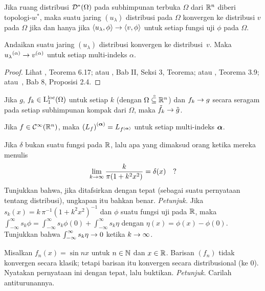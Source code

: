 \begin{prop} Jika ruang distribusi $\mathcal{D}^*(\Omega)$ pada subhimpunan terbuka $\Omega$ dari $\mathbb{R}^n$ diberi topologi-$w^*$,
maka suatu jaring $(u_\lambda)$ distribusi pada $\Omega$ konvergen ke distribusi $v$ pada $\Omega$ jika dan hanya jika
$\left\langle u_\lambda, \phi\right\rangle \rightarrow \left\langle v, \phi\right\rangle$ untuk setiap fungsi uji $\phi$ pada $\Omega$.
\end{prop}

\begin{prop} Andaikan suatu jaring $(u_\lambda)$ distribusi konvergen ke distribusi~$v$. Maka ${u_\lambda}^{(\alpha)} \rightarrow v^{(\alpha)}$
untuk setiap multi-indeks $\alpha$.
\end{prop}

\begin{proof} Lihat \cite{Rudin:1991}, Teorema 6.17; atau \cite{Yosida:1965}, Bab II, Seksi 3, Teorema; atau \cite{Grubb:2009}, Teorema 3.9;
atau~\cite{HirschL:1999}, Bab 8, Proposisi 2.4.
\end{proof}

\begin{prop} Jika $g$, $f_k \in \mathrm{L_1^{loc}}({\Omega})$ untuk setiap $k$ (dengan $\Omega\overset{\thickspace{}_\circ}{\subseteq}\mathbb{R}^n$) dan $f_k \rightarrow g$ secara seragam pada
setiap subhimpunan kompak dari $\Omega$, maka $\tilde f_k \rightarrow \tilde g$.
\end{prop}

\begin{prop} Jika $f \in \mathcal{C}^\infty(\mathbb{R}^n)$, maka $\left(L_f\right)^{(\boldsymbol{\alpha})} = L_{f^{(\boldsymbol{\alpha})}}$ untuk setiap multi-indeks $\boldsymbol{\alpha}$.
\end{prop}

\begin{exer} Jika $\delta$ bukan suatu fungsi pada $\mathbb{R}$, lalu apa yang dimaksud orang ketika mereka menulis
   \[ \lim_{k \rightarrow \infty} \frac{k}{\pi(1+k^2x^2)} = \delta(x)\quad? \]
Tunjukkan bahwa, jika ditafsirkan dengan tepat (sebagai suatu pernyataan tentang distribusi), ungkapan itu bahkan benar. \emph{Petunjuk.}
Jika $s_k(x) = k\,\pi^{-1}(1+k^2x^2)^{-1}$ dan $\phi$ suatu fungsi uji pada $\mathbb{R}$, maka
$\int_{-\infty}^\infty s_k\phi = \int_{-\infty}^\infty s_k\phi(0) + \int_{-\infty}^\infty s_k\eta$ dengan $\eta(x) = \phi(x) - \phi(0)$.
Tunjukkan bahwa $\int_{-\infty}^\infty s_k\eta \rightarrow 0$ ketika $k \rightarrow \infty$.
\end{exer}

\begin{exer} Misalkan $f_n(x) = \sin nx$ untuk $n \in \mathbb{N}$ dan $x \in \mathbb{R}$. Barisan $(f_n)$ tidak konvergen secara klasik;
tetapi barisan itu konvergen secara distribusional (ke $0$). Nyatakan pernyataan ini dengan tepat, lalu buktikan. \emph{Petunjuk.} Carilah antiturunannya.
\end{exer}

